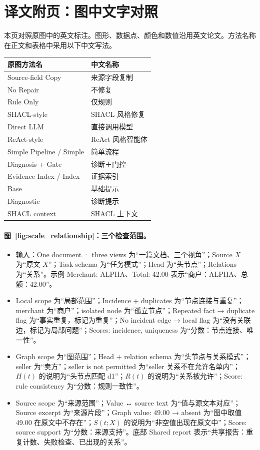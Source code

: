\clearpage
\section*{译文附页：图中文字对照}

本页对照原图中的英文标注。图形、数据点、颜色和数值沿用英文论文。方法名称在正文和表格中采用以下中文写法。

\begin{center}
\small
\begin{tabularx}{\textwidth}{lX}
\toprule
原图方法名 & 中文名称 \\
\midrule
Source-field Copy & 来源字段复制 \\
No Repair & 不修复 \\
Rule Only & 仅规则 \\
SHACL-style & SHACL 风格修复 \\
Direct LLM & 直接调用模型 \\
ReAct-style & ReAct 风格智能体 \\
Simple Pipeline / Simple & 简单流程 \\
Diagnosis + Gate & 诊断＋门控 \\
Evidence Index / Index & 证据索引 \\
Base & 基础提示 \\
Diagnostic & 诊断提示 \\
SHACL context & SHACL 上下文 \\
\bottomrule
\end{tabularx}
\end{center}

\paragraph{图~\ref{fig:scale_relationship}：三个检查范围。}
\begin{itemize}
\item 输入：One document · three views 为“一篇文档、三个视角”；Source $X$ 为“原文 $X$”；Task schema 为“任务模式”；Head 为“头节点”；Relations 为“关系”。示例 Merchant: ALPHA、Total: 42.00 表示“商户：ALPHA、总额：42.00”。
\item Local scope 为“局部范围”；Incidence + duplicates 为“节点连接与重复”；merchant 为“商户”；isolated node 为“孤立节点”；Repeated fact → duplicate flag 为“事实重复，标记为重复”；No incident edge → local flag 为“没有关联边，标记为局部问题”；Scores: incidence, uniqueness 为“分数：节点连接、唯一性”。
\item Graph scope 为“图范围”；Head + relation schema 为“头节点与关系模式”；seller 为“卖方”；seller is not permitted 为“seller 关系不在允许名单内”；$H(t)$ 的说明为“头节点匹配 d1”；$R(t)$ 的说明为“关系被允许”；Score: rule consistency 为“分数：规则一致性”。
\item Source scope 为“来源范围”；Value ↔ source text 为“值与源文本对应”；Source excerpt 为“来源片段”；Graph value: 49.00 → absent 为“图中取值 49.00 在原文中不存在”；$S(t;X)$ 的说明为“非空值出现在原文中”；Score: source support 为“分数：来源支持”。底部 Shared report 表示“共享报告：重复计数、失败检查、已出现的关系”。
\end{itemize}

